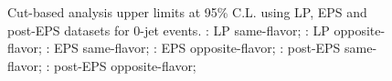 \begin{figure}[!htbp]
\caption{Cut-based analysis upper limits at 95\% C.L. using LP, EPS and post-EPS datasets for 0-jet events.
: LP same-flavor; : LP opposite-flavor;
: EPS same-flavor; : EPS opposite-flavor;
: post-EPS same-flavor; : post-EPS opposite-flavor;
}
\label{fig:limits_0j_cut}
\end{figure}

